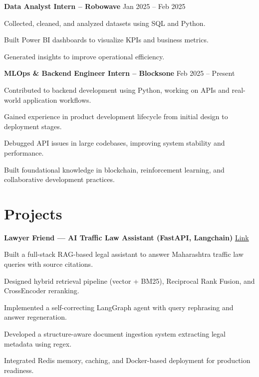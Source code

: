 \documentclass[letterpaper,10pt]{article}
\newenvironment{resume_list}{
  \vspace{-4pt}
  \begin{itemize}[leftmargin=18pt, itemsep=-3pt]
}{
  \end{itemize}
}
\begin{document}
\textbf{Data Analyst Intern – Robowave} \hfill Jan 2025 – Feb 2025
\begin{resume_list}
  \item Collected, cleaned, and analyzed datasets using SQL and Python.
  \item Built Power BI dashboards to visualize KPIs and business metrics.
  \item Generated insights to improve operational efficiency.
\end{resume_list}

\textbf{MLOps \& Backend Engineer Intern – Blocksone} \hfill Feb 2025 – Present
\begin{resume_list}
  \item Contributed to backend development using Python, working on APIs and real-world application workflows.
  \item Gained experience in product development lifecycle from initial design to deployment stages.
  \item Debugged API issues in large codebases, improving system stability and performance.
  \item Built foundational knowledge in blockchain, reinforcement learning, and collaborative development practices.
\end{resume_list}


\section*{Projects}

\textbf{Lawyer Friend — AI Traffic Law Assistant (FastAPI, Langchain)} 
\hfill \href{https://huggingface.co/spaces/krushna101211/traffic-lawyer}{Link}
\begin{resume_list}
  \item Built a full-stack RAG-based legal assistant to answer Maharashtra traffic law queries with source citations.
  \item Designed hybrid retrieval pipeline (vector + BM25), Reciprocal Rank Fusion, and CrossEncoder reranking.
  \item Implemented a self-correcting LangGraph agent with query rephrasing and answer regeneration.
  \item Developed a structure-aware document ingestion system extracting legal metadata using regex.
  \item Integrated Redis memory, caching, and Docker-based deployment for production readiness.
\end{resume_list}
\end{document}
